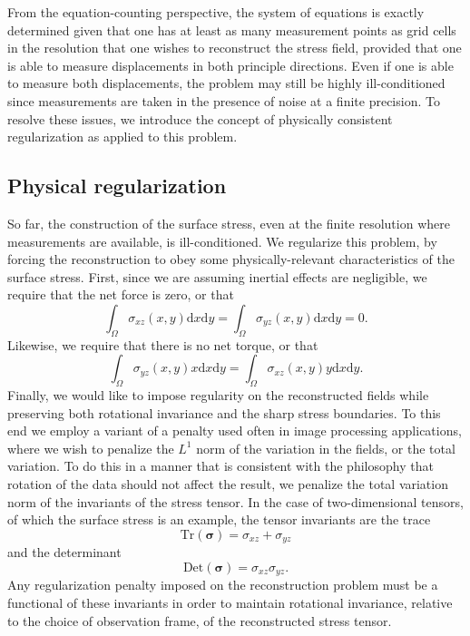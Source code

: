 \documentclass[aps,prl,reprint,twocolumn,groupedaddress,showpacs]{revtex4-1}
\newcommand{\bsigma}{{\boldsymbol\sigma}}
\def\dd{\mbox{d}}
\begin{document}
From the equation-counting perspective, the system of equations is
exactly determined given that one has at least as many measurement
points as grid cells in the resolution that one wishes to reconstruct
the stress field, provided that one is able to measure displacements
in both principle directions. Even if one is able to measure both
displacements, the problem may still be highly ill-conditioned since
measurements are taken in the presence of noise at a finite
precision. To resolve these issues, we introduce the concept of
physically consistent regularization as applied to this problem.

\subsection{Physical regularization}

So far, the construction of the surface stress, even at the finite
resolution where measurements are available, is ill-conditioned. We
regularize this problem, by forcing the reconstruction to obey some
physically-relevant characteristics of the surface stress. First,
since we are assuming inertial effects are negligible, we require that
the net force is zero, or that
\begin{equation}
\int_\Omega\sigma_{xz}(x,y)\dd x \dd y= \int_\Omega\sigma_{yz}(x,y)\dd x \dd y = 0 .
\end{equation}
Likewise, we require that there is no net torque, or that
\begin{equation}
\int_\Omega\sigma_{yz}(x,y)x \dd x \dd y  = \int_\Omega\sigma_{xz}(x,y)y \dd x \dd y .
\end{equation}
%
Finally, we would like to impose regularity on the reconstructed
fields while preserving both rotational invariance and the sharp
stress boundaries. To this end we employ a variant of a penalty used often in
image processing applications, where we wish to penalize the $L^1$
norm of the variation in the fields, or the total variation. To do
this in a manner that is consistent with the philosophy that
rotation of the data should not affect the result, we penalize the
total variation norm of the invariants of the stress tensor. In the
case of two-dimensional tensors, of which the surface stress is an
example, the tensor invariants are the trace
\begin{equation}
\textrm{Tr}(\bsigma) = \sigma_{xz} + \sigma_{yz}
\end{equation}
and the determinant
\begin{equation}
\textrm{Det}(\bsigma) = \sigma_{xz} \sigma_{yz}.
\end{equation}
Any regularization penalty imposed on the reconstruction problem must
be a functional of these invariants in order to maintain rotational
invariance, relative to the choice of observation frame, of the
reconstructed stress tensor.
 
\end{document}
